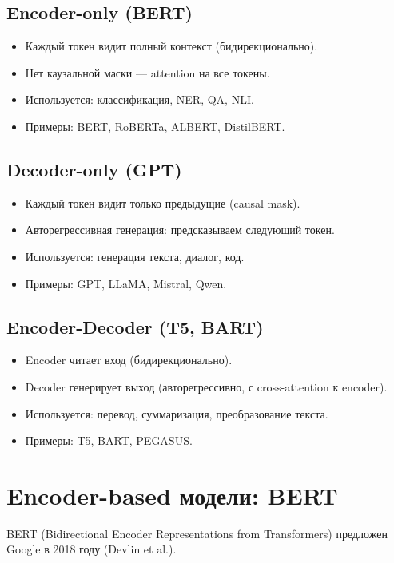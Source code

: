 \documentclass[a4paper,12pt]{article}
\begin{document}
\subsection{Encoder-only (BERT)}
\begin{itemize}
    \item Каждый токен видит полный контекст (бидирекционально).
    \item Нет каузальной маски --- attention на все токены.
    \item Используется: классификация, NER, QA, NLI.
    \item Примеры: BERT, RoBERTa, ALBERT, DistilBERT.
\end{itemize}

\subsection{Decoder-only (GPT)}
\begin{itemize}
    \item Каждый токен видит только предыдущие (causal mask).
    \item Авторегрессивная генерация: предсказываем следующий токен.
    \item Используется: генерация текста, диалог, код.
    \item Примеры: GPT, LLaMA, Mistral, Qwen.
\end{itemize}

\subsection{Encoder-Decoder (T5, BART)}
\begin{itemize}
    \item Encoder читает вход (бидирекционально).
    \item Decoder генерирует выход (авторегрессивно, с cross-attention к encoder).
    \item Используется: перевод, суммаризация, преобразование текста.
    \item Примеры: T5, BART, PEGASUS.
\end{itemize}

\section{Encoder-based модели: BERT}

BERT (Bidirectional Encoder Representations from Transformers) предложен Google в 2018 году (Devlin et al.).
\end{document}
